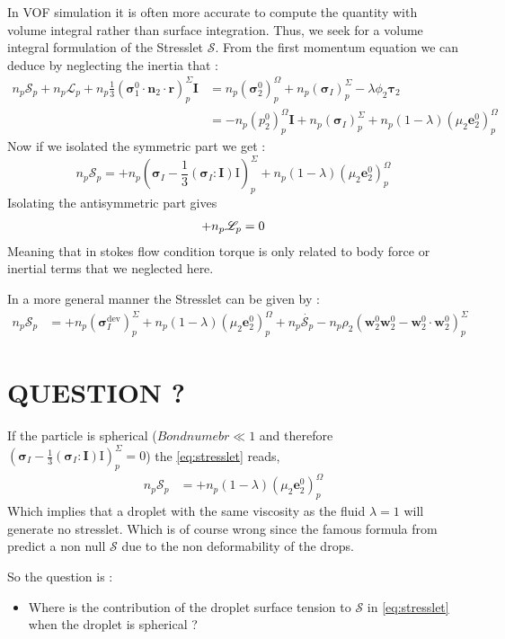 \documentclass[12pt]{My_preprint}
\renewcommand{\ref}[1]{\autoref{#1}}
\begin{document}
In VOF simulation it is often more accurate to compute the quantity with volume integral rather than surface integration.
Thus, we seek for a volume integral formulation of the Stresslet $\mathscr{S}$. 
From the first momentum equation we can deduce by neglecting the inertia that :
\begin{align*}
    n_p \mathscr{S}_p
+ n_p \mathscr{L}_p
+ n_p\frac{1}{3}(\bm{\sigma}_1^0 \cdot \textbf{n}_2 \cdot \textbf{r})_p^\Sigma \textbf{I}
    &= 
    n_p \left(
        \bm{\sigma}_2^0
    \right)_p^\Omega
    +n_p (\bm{\sigma}_I)^\Sigma_p
    - \lambda \phi_2 \bm{\tau}_2\\
    &= 
    - n_p \left(
        p_2^0
    \right)_p^\Omega \textbf{I}
    +n_p (\bm{\sigma}_I)^\Sigma_p
    + n_p (1 - \lambda)\left(
        \mu_2 \textbf{e}_2^0
    \right)_p^\Omega 
\end{align*}
Now if we isolated the symmetric part we get : 
\begin{equation}
    n_p \mathscr{S}_p
=
    +n_p (\bm{\sigma}_I - \frac{1}{3}(\bm{\sigma}_I : \textbf{I})\text{I})^\Sigma_p
    + n_p (1 - \lambda)\left(
        \mu_2 \textbf{e}_2^0
    \right)_p^\Omega 
    \label{eq:stresslet}
\end{equation}
Isolating the antisymmetric part gives
\begin{align*}
+ n_p \mathscr{L}_p\textsc{}
=
0
\end{align*}
Meaning that in stokes flow condition torque is only related to body force or inertial terms that we neglected here. 

In a more general manner the Stresslet can be given by : 
\begin{align*}
    n_p \mathscr{S}_p
    &= 
    +n_p (\bm{\sigma}_I^\text{dev})^\Sigma_p
    + n_p (1 - \lambda)\left(
        \mu_2 \textbf{e}_2^0
    \right)_p^\Omega 
    + n_p \dot{\mathcal{S}_p}
    - n_p \rho_2 (\textbf{w}_2^0\textbf{w}_2^0 - \textbf{w}_2^0\cdot \textbf{w}_2^0)_p^\Sigma
\end{align*}

\section*{QUESTION ?}

If the particle is spherical ($Bond numebr \ll 1$ and therefore $(\bm{\sigma}_I - \frac{1}{3}(\bm{\sigma}_I : \textbf{I})\text{I})^\Sigma_p =  0$) the \ref{eq:stresslet} reads, 
\begin{align*}
    n_p \mathscr{S}_p
    &= 
    + n_p (1 - \lambda)\left(
        \mu_2 \textbf{e}_2^0
    \right)_p^\Omega 
\end{align*}
Which implies that a droplet with the same viscosity as the fluid $\lambda = 1$ will generate no stresslet. 
Which is of course wrong since the famous formula from \citet{rallison1978note} predict a non null $\mathscr{S}$ due to the non deformability of the drops. 

So the question is : 
\begin{itemize}
    \item 
    Where is the contribution of the droplet surface tension to $\mathscr{S}$ in \ref{eq:stresslet} when the droplet is spherical ? 
\end{itemize}



\end{document}
